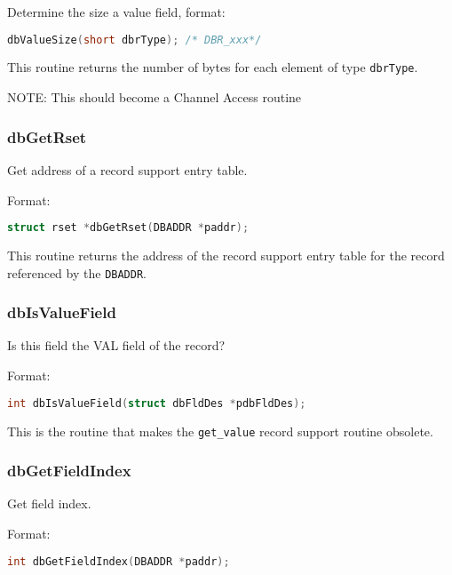 Determine the size a value field, format:

\begin{lstlisting}[language=C]
dbValueSize(short dbrType); /* DBR_xxx*/
\end{lstlisting}

This routine returns the number of bytes for each element of type \verb|dbrType|.

NOTE: This should become a Channel Access routine

\subsubsection{dbGetRset}

Get address of a record support entry table.

Format:

\begin{lstlisting}[language=C]
struct rset *dbGetRset(DBADDR *paddr);
\end{lstlisting}

This routine returns the address of the record support entry table for the record referenced by the \verb|DBADDR|.

\subsubsection{dbIsValueField}

Is this field the VAL field of the record?

Format:

\begin{lstlisting}[language=C]
int dbIsValueField(struct dbFldDes *pdbFldDes);
\end{lstlisting}

This is the routine that makes the \verb|get_value| record support routine obsolete.

\subsubsection{dbGetFieldIndex}

Get field index.

Format:

\begin{lstlisting}[language=C]
int dbGetFieldIndex(DBADDR *paddr);
\end{lstlisting}

